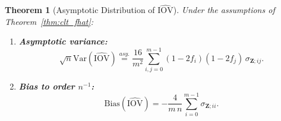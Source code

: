 ﻿\documentclass[12pt,a4paper]{scrreprt}
\newtheorem{theorem}{Theorem}[chapter]
\theoremstyle{definition}
\begin{document}
\begin{theorem}[Asymptotic Distribution of $\widehat{\mathrm{IOV}}$]\label{thm:iov_asymp}
Under the assumptions of Theorem~\ref{thm:clt_fhat}:
\begin{enumerate}
    \item[\normalfont(i)] \textbf{Asymptotic variance:}
    \begin{equation*}\label{eq:var_iov}
        \sqrt{n}\mathrm{Var}(\widehat{\mathrm{IOV}}) \overset{asy.}{=}
        \frac{16}{m^2}\sum_{i,j=0}^{m-1}(1-2f_i)(1-2f_j)\,\sigma_{\boldsymbol{Z};ij}.
    \end{equation*}
    \item[\normalfont(ii)] \textbf{Bias to order $n^{-1}$:}
    \begin{equation*}\label{eq:bias_iov}
        \mathrm{Bias}(\widehat{\mathrm{IOV}})
        = -\frac{4}{m\,n}\sum_{i=0}^{m-1}\sigma_{\boldsymbol{Z};ii}.
    \end{equation*}
\end{enumerate}
\end{theorem}
\end{document}
